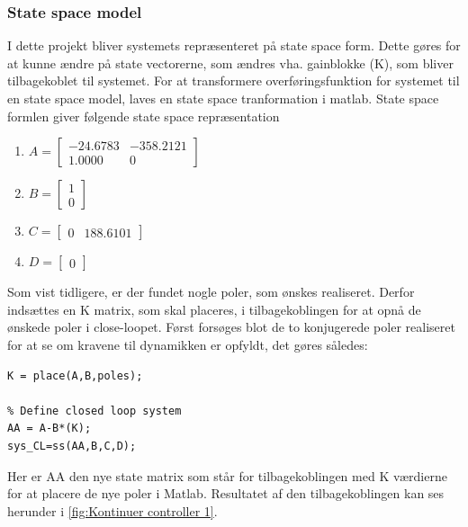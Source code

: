 \subsubsection{State space model}

I dette projekt bliver systemets repræsenteret på state space form. Dette gøres for at kunne ændre på state vectorerne, som ændres vha. gainblokke (K), som bliver tilbagekoblet til systemet. For at transformere overføringsfunktion for systemet til en state space model, laves en state space tranformation i matlab. State space formlen giver følgende state space repræsentation

\begin{enumerate}
	
	\item
	$
	A = 
	\begin{bmatrix}
	
	-24.6783 &-358.2121\\
	1.0000      &   0
	\end{bmatrix}
	$
	\item
	$
	B = 
	\begin{bmatrix}
	
	1\\
	0
	\end{bmatrix}
	$    
	
	\item 
	$
	C = 
	\begin{bmatrix}
	
	0  & 188.6101
	\end{bmatrix}
	$    
	\item
	$
	D = 
	\begin{bmatrix}
	
	0  
	\end{bmatrix}
	$  
\end{enumerate}      
Som vist tidligere, er der fundet nogle poler, som ønskes realiseret. Derfor indsættes en K matrix, som skal placeres, i tilbagekoblingen for at opnå de ønskede poler i close-loopet. Først forsøges blot de to konjugerede poler realiseret for at se om kravene til dynamikken er opfyldt, det gøres således:

\begin{lstlisting}[frame=single]
K = place(A,B,poles);

% Define closed loop system
AA = A-B*(K);
sys_CL=ss(AA,B,C,D);
\end{lstlisting}
Her er AA den nye state matrix som står for tilbagekoblingen med K værdierne for at placere de nye poler i Matlab. Resultatet af den tilbagekoblingen kan ses herunder i \autoref{fig:Kontinuer controller 1}. 

